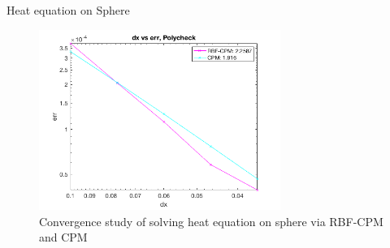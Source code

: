 \documentclass{beamer}
\begin{document}
\begin{frame}{Heat equation on Sphere}
    \begin{figure}
        \centering
        \includegraphics[width=0.7\textwidth]{UBC_IAM_5min_talk/Figures/heat_sphere/heat_sphere_RM_phs3_convergence_uniform_Polytermpt_skip_1_order_check.png}
        \caption{Convergence study of solving heat equation on sphere via RBF-CPM and CPM}
    \end{figure}
\end{frame}
\end{document}
